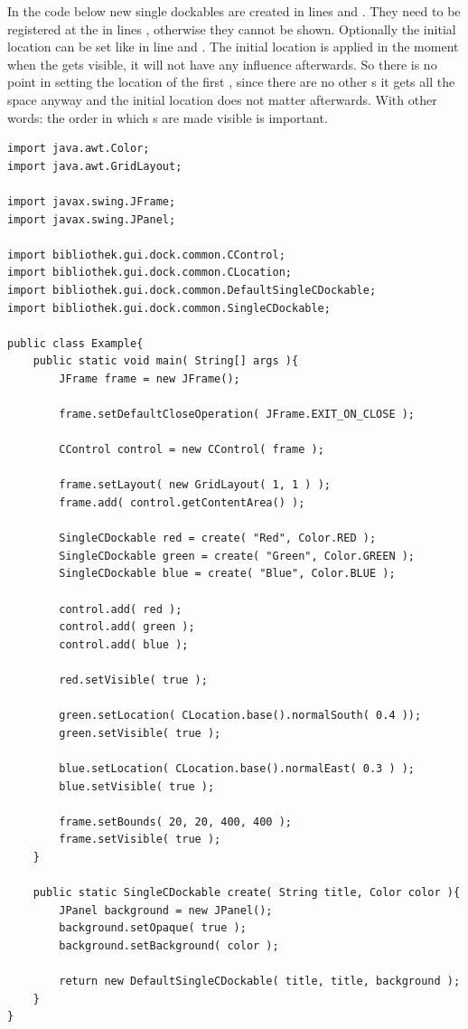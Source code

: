 In the code below new single dockables are created in lines  and . They need to be registered at the  in lines , otherwise they cannot be shown. Optionally the initial location can be set like in line  and . The initial location is applied in the moment when the  gets visible, it will not have any influence afterwards. So there is no point in setting the location of the first , since there are no other s it gets all the space anyway and the initial location does not matter afterwards. With other words: the order in which s are made visible is important.


\begin{lstlisting}
import java.awt.Color;
import java.awt.GridLayout;

import javax.swing.JFrame;
import javax.swing.JPanel;

import bibliothek.gui.dock.common.CControl;
import bibliothek.gui.dock.common.CLocation;
import bibliothek.gui.dock.common.DefaultSingleCDockable;
import bibliothek.gui.dock.common.SingleCDockable;

public class Example{
	public static void main( String[] args ){
		JFrame frame = new JFrame();
		
		frame.setDefaultCloseOperation( JFrame.EXIT_ON_CLOSE );
		
		CControl control = new CControl( frame );
		
		frame.setLayout( new GridLayout( 1, 1 ) );
		frame.add( control.getContentArea() );
		
		SingleCDockable red = create( "Red", Color.RED );
		SingleCDockable green = create( "Green", Color.GREEN );
		SingleCDockable blue = create( "Blue", Color.BLUE );
		
		control.add( red );
		control.add( green );
		control.add( blue );
		
		red.setVisible( true );
		
		green.setLocation( CLocation.base().normalSouth( 0.4 ));
		green.setVisible( true );
		
		blue.setLocation( CLocation.base().normalEast( 0.3 ) );
		blue.setVisible( true );
		
		frame.setBounds( 20, 20, 400, 400 );
		frame.setVisible( true );
	}
	
	public static SingleCDockable create( String title, Color color ){
		JPanel background = new JPanel();
		background.setOpaque( true );
		background.setBackground( color );
		
		return new DefaultSingleCDockable( title, title, background );
	}
}

\end{lstlisting} 
